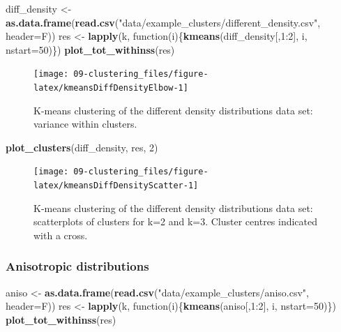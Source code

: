 \documentclass[]{book}
\newenvironment{Shaded}{\begin{snugshade}}{\end{snugshade}}
\newcommand{\KeywordTok}[1]{\textcolor[rgb]{0.13,0.29,0.53}{\textbf{{#1}}}}
\newcommand{\DataTypeTok}[1]{\textcolor[rgb]{0.13,0.29,0.53}{{#1}}}
\newcommand{\DecValTok}[1]{\textcolor[rgb]{0.00,0.00,0.81}{{#1}}}
\newcommand{\StringTok}[1]{\textcolor[rgb]{0.31,0.60,0.02}{{#1}}}
\newcommand{\NormalTok}[1]{{#1}}
\theoremstyle{definition}
\theoremstyle{definition}
\theoremstyle{definition}
\theoremstyle{remark}
\begin{document}
\begin{Shaded}
\begin{Highlighting}[]
\NormalTok{diff_density <-}\StringTok{ }\KeywordTok{as.data.frame}\NormalTok{(}\KeywordTok{read.csv}\NormalTok{(}\StringTok{"data/example_clusters/different_density.csv"}\NormalTok{, }\DataTypeTok{header=}\NormalTok{F))}
\NormalTok{res <-}\StringTok{ }\KeywordTok{lapply}\NormalTok{(k, function(i)\{}\KeywordTok{kmeans}\NormalTok{(diff_density[,}\DecValTok{1}\NormalTok{:}\DecValTok{2}\NormalTok{], i, }\DataTypeTok{nstart=}\DecValTok{50}\NormalTok{)\})}
\KeywordTok{plot_tot_withinss}\NormalTok{(res)}
\end{Highlighting}
\end{Shaded}

\begin{figure}

{\centering \texttt{[image: 09-clustering\_files/figure-latex/kmeansDiffDensityElbow-1]} 

}

\caption{K-means clustering of the different density distributions data set: variance within clusters.}\label{fig:kmeansDiffDensityElbow}
\end{figure}

\begin{Shaded}
\begin{Highlighting}[]
\KeywordTok{plot_clusters}\NormalTok{(diff_density, res, }\DecValTok{2}\NormalTok{)}
\end{Highlighting}
\end{Shaded}

\begin{figure}

{\centering \texttt{[image: 09-clustering\_files/figure-latex/kmeansDiffDensityScatter-1]} 

}

\caption{K-means clustering of the different density distributions data set: scatterplots of clusters for k=2 and k=3. Cluster centres indicated with a cross.}\label{fig:kmeansDiffDensityScatter}
\end{figure}

\subsubsection{Anisotropic
distributions}\label{anisotropic-distributions}

\begin{Shaded}
\begin{Highlighting}[]
\NormalTok{aniso <-}\StringTok{ }\KeywordTok{as.data.frame}\NormalTok{(}\KeywordTok{read.csv}\NormalTok{(}\StringTok{"data/example_clusters/aniso.csv"}\NormalTok{, }\DataTypeTok{header=}\NormalTok{F))}
\NormalTok{res <-}\StringTok{ }\KeywordTok{lapply}\NormalTok{(k, function(i)\{}\KeywordTok{kmeans}\NormalTok{(aniso[,}\DecValTok{1}\NormalTok{:}\DecValTok{2}\NormalTok{], i, }\DataTypeTok{nstart=}\DecValTok{50}\NormalTok{)\})}
\KeywordTok{plot_tot_withinss}\NormalTok{(res)}
\end{Highlighting}
\end{Shaded}
\end{document}
